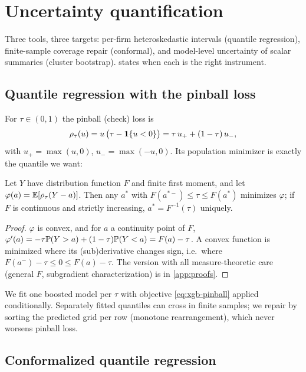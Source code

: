\section{Uncertainty quantification}\label{cheu:sec:uq}

Three tools, three targets: per-firm heteroskedastic intervals (quantile regression),
finite-sample coverage repair (conformal), and model-level uncertainty of scalar summaries
(cluster bootstrap).  states when each is the right instrument.

\subsection{Quantile regression with the pinball loss}

For $\tau \in (0,1)$ the pinball (check) loss is
\begin{equation}\label{eq:xgb-pinball}
\rho_\tau(u) = u\,\bigl(\tau - \mathbf{1}\{u < 0\}\bigr)
= \tau\, u_+ + (1-\tau)\, u_-,
\end{equation}
with $u_+ = \max(u,0)$, $u_- = \max(-u,0)$. Its population minimizer is exactly the quantile we
want:

\begin{proposition}
\label{prop:xgb-pinball} Let $Y$ have distribution function $F$ and finite first moment, and let
$\varphi(a) = \mathbb{E}[\rho_\tau(Y - a)]$. Then any $a^*$ with $F(a^{*-}) \le \tau \le F(a^*)$
minimizes $\varphi$; if $F$ is continuous and strictly increasing, $a^* = F^{-1}(\tau)$
uniquely.
\end{proposition}

\begin{proof}
$\varphi$ is convex, and for $a$ a continuity point of $F$, $\varphi'(a) = -\tau \mathbb{P}(Y > a) +
(1-\tau)\mathbb{P}(Y < a) = F(a) - \tau$. A convex function is minimized where its (sub)derivative
changes sign, i.e.\ where $F(a^{-}) - \tau \le 0 \le F(a) - \tau$. The version with all
measure-theoretic care (general $F$, subgradient characterization) is in \cref{app:proofs}.
\end{proof}

We fit one boosted model per $\tau$ with objective \cref{eq:xgb-pinball} applied conditionally.
Separately fitted quantiles can cross in finite samples; we repair by sorting the predicted grid
per row (monotone rearrangement), which never worsens pinball loss.

\subsection{Conformalized quantile regression}

